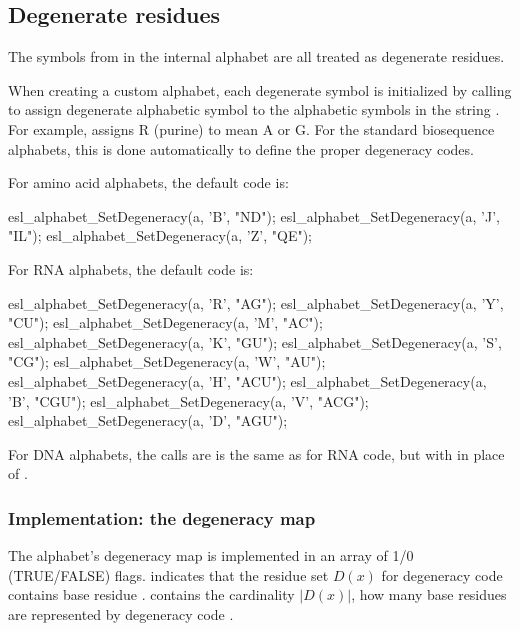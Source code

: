 \subsection{Degenerate residues}

The symbols from  in the internal alphabet are all
treated as degenerate residues.

When creating a custom alphabet, each degenerate symbol is initialized
by calling  to
assign degenerate alphabetic symbol  to the alphabetic
symbols in the string . For example,
 assigns R
(purine) to mean A or G.  For the standard biosequence alphabets, this
is done automatically to define the proper degeneracy codes.

For amino acid alphabets, the default code is:

\begin{cchunk}  
  esl_alphabet_SetDegeneracy(a, 'B', "ND");
  esl_alphabet_SetDegeneracy(a, 'J', "IL");
  esl_alphabet_SetDegeneracy(a, 'Z', "QE");
\end{cchunk}

For RNA alphabets, the default code is:

\begin{cchunk}
  esl_alphabet_SetDegeneracy(a, 'R', "AG");
  esl_alphabet_SetDegeneracy(a, 'Y', "CU");
  esl_alphabet_SetDegeneracy(a, 'M', "AC");
  esl_alphabet_SetDegeneracy(a, 'K', "GU");
  esl_alphabet_SetDegeneracy(a, 'S', "CG");
  esl_alphabet_SetDegeneracy(a, 'W', "AU");
  esl_alphabet_SetDegeneracy(a, 'H', "ACU");
  esl_alphabet_SetDegeneracy(a, 'B', "CGU");
  esl_alphabet_SetDegeneracy(a, 'V', "ACG");
  esl_alphabet_SetDegeneracy(a, 'D', "AGU");  
\end{cchunk}

For DNA alphabets, the calls are is the same as for RNA code, but with
 in place of .


\subsubsection{Implementation: the degeneracy map}

The alphabet's degeneracy map is implemented in an array
 of 1/0 (TRUE/FALSE) flags.
 indicates that the residue set $D(x)$
for degeneracy code  contains base residue .
 contains the cardinality $|D(x)|$, how many base
residues are represented by degeneracy code .

